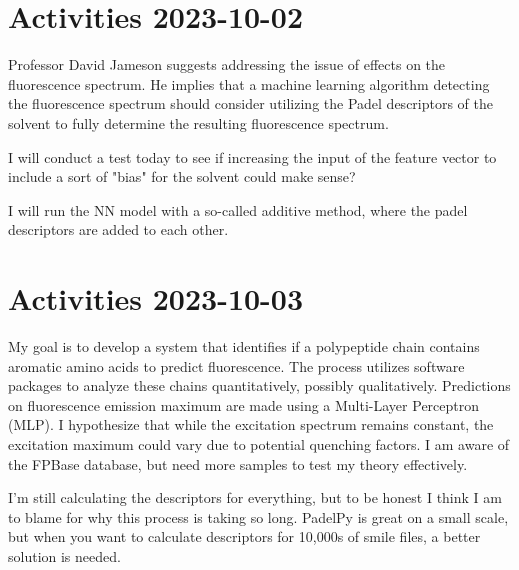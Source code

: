 \documentclass{article}
\begin{document}
\section{Activities 2023-10-02}
Professor David Jameson suggests addressing the issue of effects on the fluorescence spectrum. He implies that a machine learning algorithm detecting the fluorescence spectrum should consider utilizing the Padel descriptors of the solvent to fully determine the resulting fluorescence spectrum.

I will conduct a test today to see if increasing the input of the feature vector to include a sort of "bias" for the solvent could make sense?

I will run the NN model with a so-called additive method, where the padel descriptors are added to each other.

\section{Activities 2023-10-03}
My goal is to develop a system that identifies if a polypeptide chain contains aromatic amino acids to predict fluorescence. The process utilizes software packages to analyze these chains quantitatively, possibly qualitatively. Predictions on fluorescence emission maximum are made using a Multi-Layer Perceptron (MLP). I hypothesize that while the excitation spectrum remains constant, the excitation maximum could vary due to potential quenching factors. I am aware of the FPBase database, but need more samples to test my theory effectively.

I'm still calculating the descriptors for everything, but to be honest I think I am to blame for why this process is taking so long. PadelPy is great on a small scale, but when you want to calculate descriptors for 10,000s of smile files, a better solution is needed.
\end{document}
